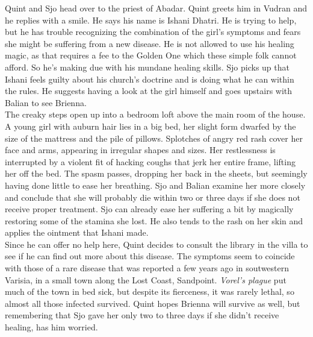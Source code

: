 Quint and Sjo head over to the priest of Abadar. Quint greets him in Vudran and he replies with a smile. He says his name is Ishani Dhatri. He is trying to help, but he has trouble recognizing the combination of the girl's symptoms and fears she might be suffering from a new disease. He is not allowed to use his healing magic, as that requires a fee to the Golden One which these simple folk cannot afford. So he's making due with his mundane healing skills. Sjo picks up that Ishani feels guilty about his church's doctrine and is doing what he can within the rules. He suggests having a look at the girl himself and goes upstairs with Balian to see Brienna.\\

The creaky steps open up into a bedroom loft above the main room of the house. A young girl with auburn hair lies in a big bed, her slight form dwarfed by the size of the mattress and the pile of pillows. Splotches of angry red rash cover her face and arms, appearing in irregular shapes and sizes. Her restlessness is interrupted by a violent fit of hacking coughs that jerk her entire frame, lifting her off the bed. The spasm passes, dropping her back in the sheets, but seemingly having done little to ease her breathing. Sjo and Balian examine her more closely and conclude that she will probably die within two or three days if she does not receive proper treatment. Sjo can already ease her suffering a bit by magically restoring some of the stamina she lost. He also tends to the rash on her skin and applies the ointment that Ishani made.\\

Since he can offer no help here, Quint decides to consult the library in the villa to see if he can find out more about this disease. The symptoms seem to coincide with those of a rare disease that was reported a few years ago in soutwestern Varisia, in a small town along the Lost Coast, Sandpoint. {\itshape Vorel's plague} put much of the town in bed sick, but despite its fierceness, it was rarely lethal, so almost all those infected survived. Quint hopes Brienna will survive as well, but remembering that Sjo gave her only two to three days if she didn't receive healing, has him worried. 